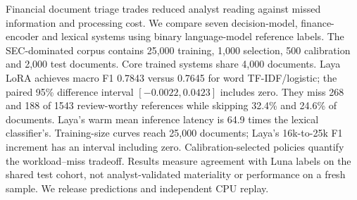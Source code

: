 Financial document triage trades reduced analyst reading against missed information and processing cost. We compare seven decision-model, finance-encoder and lexical systems using binary language-model reference labels. The SEC-dominated corpus contains 25,000 training, 1,000 selection, 500 calibration and 2,000 test documents. Core trained systems share 4,000 documents. Laya LoRA achieves macro F1 0.7843 versus 0.7645 for word TF-IDF/logistic; the paired 95\% difference interval $[-0.0022, 0.0423]$ includes zero. They miss 268 and 188 of 1543 review-worthy references while skipping 32.4\% and 24.6\% of documents. Laya's warm mean inference latency is 64.9 times the lexical classifier's. Training-size curves reach 25,000 documents; Laya's 16k-to-25k F1 increment has an interval including zero. Calibration-selected policies quantify the workload--miss tradeoff. Results measure agreement with Luna labels on the shared test cohort, not analyst-validated materiality or performance on a fresh sample. We release predictions and independent CPU replay.
